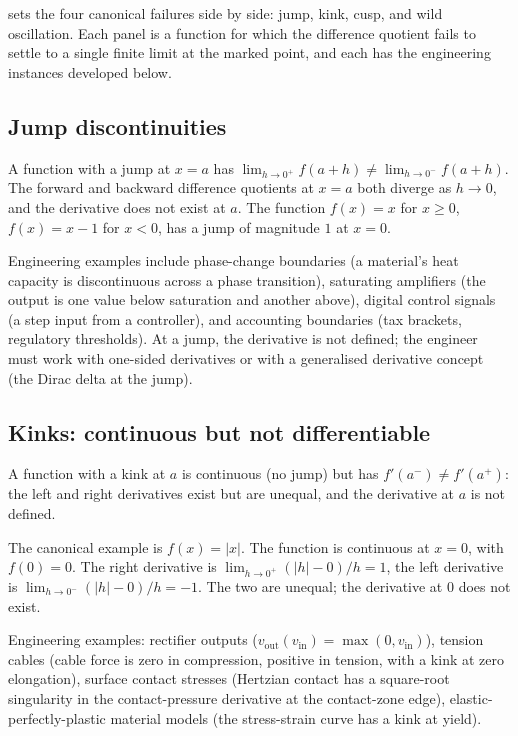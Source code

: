 

 sets the four canonical
failures side by side: jump, kink, cusp, and wild oscillation. Each
panel is a function for which the difference quotient fails to
settle to a single finite limit at the marked point, and each has
the engineering instances developed below.

\subsection{Jump discontinuities}

A function with a jump at $x = a$ has $\lim_{h \to 0^{+}} f(a +
h) \neq \lim_{h \to 0^{-}} f(a + h)$. The forward and backward
difference quotients at $x = a$ both diverge as $h \to 0$, and
the derivative does not exist at $a$. The function $f(x) = x$ for
$x \geq 0$, $f(x) = x - 1$ for $x < 0$, has a jump of magnitude
$1$ at $x = 0$.

Engineering examples include phase-change boundaries (a material's
heat capacity is discontinuous across a phase transition), saturating
amplifiers (the output is one value below saturation and another
above), digital control signals (a step input from a controller),
and accounting boundaries (tax brackets, regulatory thresholds).
At a jump, the derivative is not defined; the engineer must work
with one-sided derivatives or with a generalised derivative
concept (the Dirac delta at the jump).

\subsection{Kinks: continuous but not differentiable}

A function with a kink at $a$ is continuous (no jump) but has
$f'(a^{-}) \neq f'(a^{+})$: the left and right derivatives exist
but are unequal, and the derivative at $a$ is not defined.

The canonical example is $f(x) = |x|$. The function is continuous
at $x = 0$, with $f(0) = 0$. The right derivative is $\lim_{h \to
0^{+}} (|h| - 0)/h = 1$, the left derivative is $\lim_{h \to
0^{-}} (|h| - 0)/h = -1$. The two are unequal; the derivative at
$0$ does not exist.

Engineering examples: rectifier outputs ($v_{\text{out}}(v_{\text
{in}}) = \max(0, v_{\text{in}})$), tension cables (cable force
is zero in compression, positive in tension, with a kink at zero
elongation), surface contact stresses (Hertzian contact has a
square-root singularity in the contact-pressure derivative at the
contact-zone edge), elastic-perfectly-plastic material models (the
stress-strain curve has a kink at yield).

